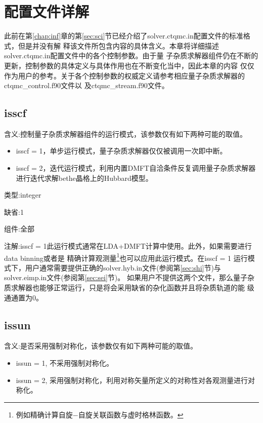 \chapter{{\iqist}配置文件详解}
\label{chap:sci}

此前在第\ref{chap:inf}章的第\ref{sec:sci}节已经介绍了solver.ctqmc.in配置文件的标准格式，但是并没有解
释该文件所包含内容的具体含义。本章将详细描述solver.ctqmc.in配置文件中的各个控制参数。由于量
子杂质求解器组件仍在不断的更新，控制参数的具体定义与具体作用也在不断变化当中，因此本章的内容
仅仅作为用户的参考。关于各个控制参数的权威定义请参考相应量子杂质求解器的ctqmc\_control.f90文件以
及ctqmc\_stream.f90文件。

\section{isscf }
\label{sec:isscf}

{\color{red}含义}:控制量子杂质求解器组件的运行模式，该参数仅有如下两种可能的取值。
\begin{itemize}
\item isscf = 1，单步运行模式，量子杂质求解器仅仅被调用一次即中断。
\item isscf = 2，迭代运行模式，利用内置DMFT自洽条件反复调用量子杂质求解器进行迭代求解bethe晶格上的Hubbard模型。
\end{itemize}

{\color{green}类型}:integer

{\color{blue}缺省}:1

{\color{brown}组件}:全部

{\color{purple}注解}:isscf = 1此运行模式通常在LDA+DMFT计算中使用。此外，如果需要进行data binning或者是
精确计算观测量\footnote{例如精确计算自旋$-$自旋关联函数与虚时格林函数。}也可以应用此运行模式。在isscf = 1
运行模式下，用户通常需要提供正确的solver.hyb.in文件(参阅第\ref{sec:shi}节)与solver.eimp.in文件(参阅第\ref{sec:sei}节)。
如果用户不提供这两个文件，那么量子杂质求解器也能够正常运行，只是将会采用缺省的杂化函数并且将杂质轨道的能
级通通置为0。

\section{issun }
\label{sec:issun}

{\color{red}含义}:是否采用强制对称化，该参数仅有如下两种可能的取值。
\begin{itemize}
\item issun = 1, 不采用强制对称化。
\item issun = 2, 采用强制对称化，利用对称矢量所定义的对称性对各观测量进行对称化。
\end{itemize}

